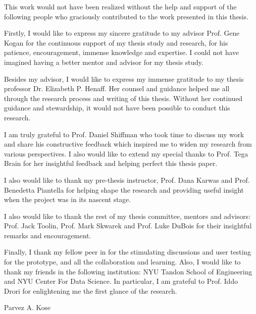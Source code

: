 %
%
%
%
%

\begin{acknowledgments} 

This work would not have been realized without the help and support of the following people who graciously contributed to the work presented in this thesis.

Firstly, I would like to express my sincere gratitude to my advisor Prof. Gene Kogan for the continuous support of my thesis study and research, for his patience, encouragement, immense knowledge and expertise. I could not have imagined having a better mentor and advisor for my thesis study.

Besides my advisor, I would like to express my immense gratitude to my thesis professor Dr. Elizabeth P. Henaff. Her counsel and guidance helped me all through the research process and writing of this thesis. Without her continued guidance and stewardship, it would not have been possible to conduct this research.

I am truly grateful to Prof. Daniel Shiffman who took time to discuss my work and share his constructive feedback which inspired me to widen my research from various perspectives. I also would like to extend my special thanks to Prof. Tega Brain for her insightful feedback and helping perfect this thesis paper.

I also would like to thank my pre-thesis instructor, Prof. Dana Karwas and Prof. Benedetta Piantella for helping shape the research and providing useful insight when the project was in its nascent stage.

I also would like to thank the rest of my thesis committee, mentors and advisors: Prof. Jack Toolin, Prof. Mark Skwarek and Prof. Luke DuBois for their insightful remarks and encouragement.

Finally, I thank my fellow peer in for the stimulating discussions and user testing for the prototype, and all the collaboration and learning. Also, I would like to thank my friends in the following institution: NYU Tandon School of Engineering and NYU Center For Data Science. In particular, I am grateful to Prof. Iddo Drori for enlightening me the first glance of the research.


\begin{flushright} 
Parvez A. Kose
\end{flushright}
\end{acknowledgments}

